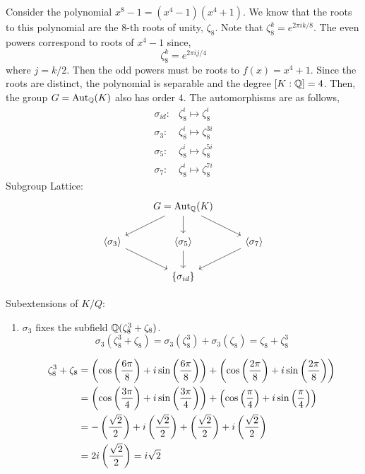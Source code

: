 \documentclass[12pt]{article}
\begin{document}
\begin{solution}
    \bbni 
    
    Consider the polynomial $x^8 -1 = (x^4 - 1)(x^4 + 1)$. We know that the roots to this polynomial are the $8$-th roots of unity, $\zeta_8$. Note that $\zeta_8^k = e^{2\pi i k/8}$. The even powers correspond to roots of $x^4 -1$ since,  
    \[\zeta_8^k = e^{2\pi i j/4}\] 
    where $j = k/2$. Then the odd powers must be roots to $f(x) = x^4 + 1$. Since the roots are distinct, the polynomial is separable and the degree $[K:\mathbb Q] = 4$. Then, the group $G = \operatorname{Aut}_{\mathbb Q}(K)$ also has order $4$. The automorphisms are as follows, 
     \begin{align*}
            \sigma_{id}:& \zeta_8^i \mapsto \zeta_{8}^i \\ 
            \sigma_{3}:& \zeta_8^i \mapsto \zeta_8^{3i} \\
            \sigma_{5}: & \zeta_8^i \mapsto \zeta_8^{5i} \\
            \sigma_{7}: & \zeta_8^i \mapsto \zeta_8^{7i} 
         \end{align*}
    Subgroup Lattice: 
    \[
    \begin{tikzcd}
    & G = \Aut_\Q(K) \arrow[dl] \arrow[d] \arrow[dr] & \\
    \langle \sigma_3 \rangle \arrow[dr] & 
    \langle \sigma_5 \rangle \arrow[d] & 
    \langle \sigma_7 \rangle \arrow[dl] \\
    & \{\sigma_{id}\} &
    \end{tikzcd}
    \]

    Subextensions of $K/Q$: 
    \begin{enumerate}
        \item  $\sigma_3$ fixes the subfield $\mathbb Q(\zeta_8^3 + \zeta_8)$. 
        \[\sigma_3(\zeta_8^3 + \zeta_8) = \sigma_3(\zeta_8^3) + \sigma_3(\zeta_8) = \zeta_8 + \zeta_8^3\]

        \begin{align*}
            \zeta_8^3 + \zeta_8 &= \left(\cos\left(\frac{6\pi}{8}\right) + i \sin \left(\frac{6\pi}{8}\right)\right) + \left(\cos\left(\frac{2\pi}{8}\right) + i \sin \left(\frac{2\pi}{8}\right)\right) \\ 
            &=\left(\cos\left(\frac{3\pi}{4}\right) + i \sin \left(\frac{3\pi}{4}\right)\right) + \left(\cos\left(\frac{\pi}{4}\right) + i \sin \left(\frac{\pi}{4}\right)\right) \\ 
            &= -\left(\frac{\sqrt{2}}{2}\right)  + i \left(\frac{\sqrt{2}}{2}\right)  +\left(\frac{\sqrt{2}}{2}\right) + i \left(\frac{\sqrt{2}}{2}\right) \\
            &= 2i \left(\frac{\sqrt{2}}{2}\right)  = i\sqrt{2} 
        \end{align*}


\end{enumerate}
\end{solution}
\end{document}
